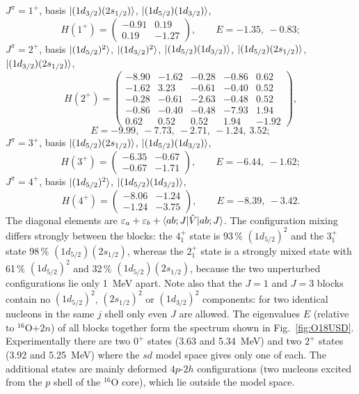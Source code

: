 \documentclass[11pt,a4paper]{article}
\newcommand{\op}[1]{\hat{#1}}
\begin{document}
$J^\pi=1^+$, basis $\ket{(1d_{3/2})(2s_{1/2})}$, $\ket{(1d_{5/2})(1d_{3/2})}$,
\[
H(1^+)=
\begin{pmatrix}
-0.91 & 0.19\\
0.19 & -1.27
\end{pmatrix},
\qquad E=-1.35,\ -0.83;
\]
$J^\pi=2^+$, basis $\ket{(1d_{5/2})^2}$, $\ket{(1d_{3/2})^2}$, $\ket{(1d_{5/2})(1d_{3/2})}$, $\ket{(1d_{5/2})(2s_{1/2})}$, $\ket{(1d_{3/2})(2s_{1/2})}$,
\[
H(2^+)=
\begin{pmatrix}
-8.90 & -1.62 & -0.28 & -0.86 & 0.62\\
-1.62 & 3.23 & -0.61 & -0.40 & 0.52\\
-0.28 & -0.61 & -2.63 & -0.48 & 0.52\\
-0.86 & -0.40 & -0.48 & -7.93 & 1.94\\
0.62 & 0.52 & 0.52 & 1.94 & -1.92
\end{pmatrix},
\]
\[
E=-9.99,\ -7.73,\ -2.71,\ -1.24,\ 3.52;
\]
$J^\pi=3^+$, basis $\ket{(1d_{5/2})(2s_{1/2})}$, $\ket{(1d_{5/2})(1d_{3/2})}$,
\[
H(3^+)=
\begin{pmatrix}
-6.35 & -0.67\\
-0.67 & -1.71
\end{pmatrix},
\qquad E=-6.44,\ -1.62;
\]
$J^\pi=4^+$, basis $\ket{(1d_{5/2})^2}$, $\ket{(1d_{5/2})(1d_{3/2})}$,
\[
H(4^+)=
\begin{pmatrix}
-8.06 & -1.24\\
-1.24 & -3.75
\end{pmatrix},
\qquad E=-8.39,\ -3.42.
\]
The diagonal elements are $\varepsilon_a+\varepsilon_b+\braket{ab;J|\op V|ab;J}$. The configuration mixing differs strongly between the blocks: the $4^+_1$ state is 93\,\% $(1d_{5/2})^2$ and the $3^+_1$ state 98\,\% $(1d_{5/2})(2s_{1/2})$, whereas the $2^+_1$ state is a strongly mixed state with 61\,\% $(1d_{5/2})^2$ and 32\,\% $(1d_{5/2})(2s_{1/2})$, because the two unperturbed configurations lie only 1~MeV apart. Note also that the $J=1$ and $J=3$ blocks contain no $(1d_{5/2})^2$, $(2s_{1/2})^2$ or $(1d_{3/2})^2$ components: for two identical nucleons in the same $j$ shell only even $J$ are allowed.
The eigenvalues $E$ (relative to ${}^{16}$O$+2n$) of all blocks together form the spectrum shown in Fig.~\ref{fig:O18USD}. Experimentally there are two $0^+$ states (3.63 and 5.34~MeV) and two $2^+$ states (3.92 and 5.25~MeV) where the $sd$ model space gives only one of each. The additional states are mainly deformed $4p$-$2h$ configurations (two nucleons excited from the $p$ shell of the ${}^{16}$O core), which lie outside the model space.
\end{document}
